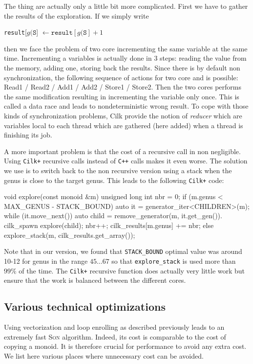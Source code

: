 \documentclass[reqno,11pt]{amsart}
\theoremstyle{plain}
\theoremstyle{definition}
\renewcommand{\tt}[1]{\texttt{#1}}
\begin{document}
The thing are actually only a little bit more complicated. First we have to
gather the results of the exploration. If we simply write
\begin{algorithmic}[1]
\State \tt{result}[$g(\tt{S}$] $\gets \tt{result}[g(\tt{S}] + 1$
\end{algorithmic}
then we face the problem of two core incrementing the same variable at the
same time. Incrementing a variables is actually done in 3 steps: reading the
value from the memory, adding one, storing back the results. Since there is by
default non synchronization, the following sequence of actions for two core
and is possible: Read1 / Read2 / Add1 / Add2 / Store1 / Store2. Then the two
cores performs the same modification resulting in incrementing the variable
only once. This is called a data race and leads to nondeterministic wrong
result. To cope with those kinds of synchronization problems, Cilk provide the
notion of \emph{reducer} which are variables local to each thread which are
gathered (here added) when a thread is finishing its job.

A more important problem is that the cost of a recursive call in non
negligible. Using \tt{Cilk+} recursive calls instead of \tt{C++} calls makes
it even worse. The solution we use is to switch back to the non recursive
version using a stack when the genus is close to the target genus. This leads
to the following \tt{Cilk+} code:
\begin{listing}{1}
void explore(const monoid &m) {
  unsigned long int nbr = 0;
  if (m.genus < MAX_GENUS - STACK_BOUND) {
    auto it = generator_iter<CHILDREN>(m);
    while (it.move_next()) {
      auto child = remove_generator(m, it.get_gen()).
      cilk_spawn explore(child);
      nbr++;
    }
    cilk_results[m.genus] += nbr;
  }
  else explore_stack(m, cilk_results.get_array());
}
\end{listing}
Note that in our version, we found that \tt{STACK\_BOUND} optimal value was
around 10-12 for genus in the range $45\dots 67$ so that \tt{explore\_stack}
is used more than $99\%$ of the time. The \tt{Cilk+} recursive function does
actually very little work but ensure that the work is balanced between the
different cores.

\subsection{Various technical optimizations}

Using vectorization and loop enrolling as described previously leads to an
extremely fast \textsc{Son} algorithm. Indeed, its cost is comparable to the cost
of copying a monoid. It is therefore crucial for performance to avoid any
extra cost. We list here various places where unnecessary cost can be avoided.
\end{document}
